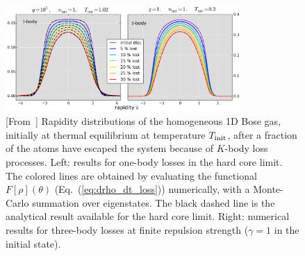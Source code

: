 \documentclass[onecolumn,amsfonts,showpacs,superscriptaddress]{revtex4-1}
\begin{document}
\begin{figure}[tb]
    \centering
    \includegraphics[width=0.8\textwidth]{figures/losses.png}
    \caption{[From~\cite{bouchoule_effect_2020}] Rapidity distributions of the homogeneous 1D Bose gas, initially at thermal equilibrium at temperature $T_{\rm init}$, after a fraction of the atoms have escaped the system because of $K$-body loss processes. Left: results for one-body losses in the hard core limit. The colored lines are obtained by evaluating the functional $F[\rho](\theta)$ (Eq.~(\ref{eq:drho_dt_loss})) numerically, with a Monte-Carlo summation over eigenstates. The black dashed line is the analytical result available for the hard core limit. Right: numerical results for three-body losses at finite repulsion strength ($\gamma = 1$ in the initial state).}
    \label{fig:losses}
\end{figure}
\end{document}
